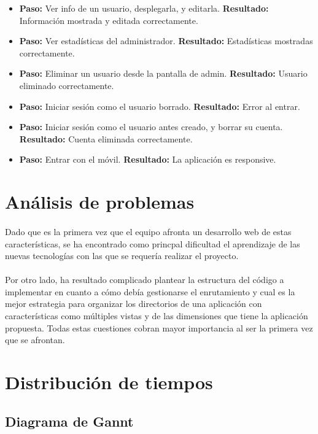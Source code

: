 \documentclass[a4paper]{article}
\begin{document}
\begin{itemize}
    \item \textbf{Paso: }Ver info de un usuario, desplegarla, y editarla. \textbf{Resultado: }Información mostrada y editada correctamente.
    \item \textbf{Paso: }Ver estadísticas del administrador. \textbf{Resultado: }Estadísticas mostradas correctamente.
    \item \textbf{Paso: }Eliminar un usuario desde la pantalla de admin. \textbf{Resultado: }Usuario eliminado correctamente.
    \item \textbf{Paso: }Iniciar sesión como el usuario borrado. \textbf{Resultado: }Error al entrar.
    \item \textbf{Paso: }Iniciar sesión como el usuario antes creado, y borrar su cuenta. \textbf{Resultado: }Cuenta eliminada correctamente.
    \item \textbf{Paso: }Entrar con el móvil. \textbf{Resultado: }La aplicación es responsive.
\end{itemize}

\section{Análisis de problemas}

	\paragraph{} Dado que es la primera vez que el equipo afronta un desarrollo web de estas características, se ha encontrado como princpal dificultad el aprendizaje de las nuevas tecnologías con las que se requería realizar el proyecto.
	
	\paragraph{} Por otro lado, ha resultado complicado plantear la estructura del código a implementar en cuanto a cómo debía gestionarse el enrutamiento y cual es la mejor estrategia para organizar los directorios de una aplicación con características como múltiples vistas y de las dimensiones que tiene la aplicación propuesta. Todas estas cuestiones cobran mayor importancia al ser la primera vez que se afrontan.

\section{Distribución de tiempos}
	\subsection{Diagrama de Gannt}
\end{document}
